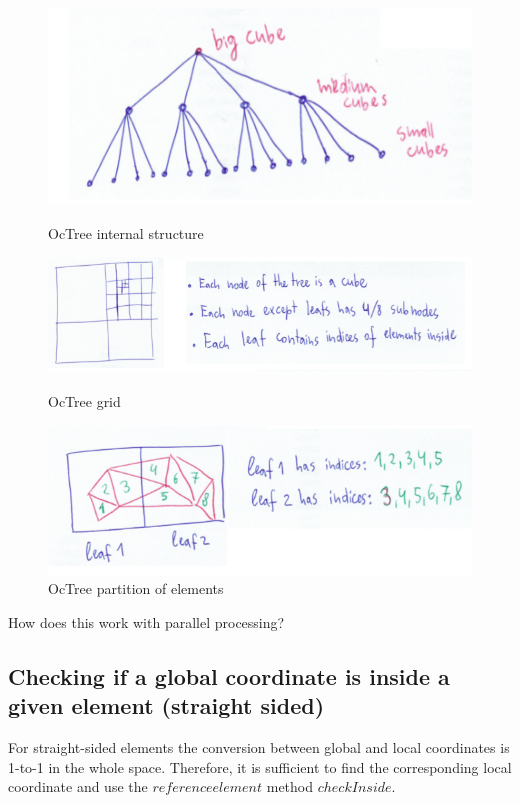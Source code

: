 \documentclass[12pt]{article}
\begin{document}
\begin{figure}[hp]
    \centering
    \includegraphics[scale=0.7]{doc-pics/pic-octree-3.png}
	\caption{OcTree internal structure}    
    
    \includegraphics[scale=0.7]{doc-pics/pic-octree-1.png}
	\caption{OcTree grid}    
	
    \includegraphics[scale=0.7]{doc-pics/pic-octree-2.png}
	\caption{OcTree partition of elements}    
\end{figure}


\noindent
How does this work with parallel processing?

\subsection{Checking if a global coordinate is inside a given element (straight sided)}
\label{subsection-isinside-linear}

\noindent
For straight-sided elements the conversion between global and local coordinates is 1-to-1 in the whole space.
Therefore, it is sufficient to find the corresponding local coordinate and use the $referenceelement$ method $checkInside$. \\
\end{document}
